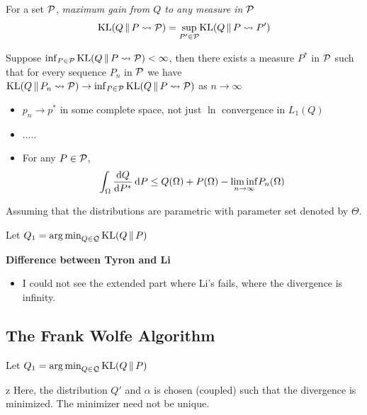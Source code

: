 For a set $\mathcal{P}$, \emph{maximum gain from $Q$ to any measure in $\mathcal{P}$}
\begin{equation*}
	\KL{Q}{P \rightsquigarrow \Pc}=\underset{P'\in\Pc}{\sup} \KL{Q}{P \rightsquigarrow P'}
\end{equation*}

\begin{thm}[Tyron]
	Suppose $\inf_{P\in\mathcal{P}} {\mathrm{KL}}({Q} \,\Vert\, {P \rightsquigarrow \mathcal{P}}) < \infty$, 
	then there exists a measure $P^*$ in $\mathcal{P}$
	such that for every sequence $P_n$ in $\mathcal{P}$ 
	we have \\
	${\mathrm{KL}}({Q} \,\Vert\, {P_n \rightsquigarrow \mathcal{P}}) \to \inf_{P\in\mathcal{P}}{\mathrm{KL}}({Q} \,\Vert\, {P \rightsquigarrow \mathcal{P}})$ as $n\to\infty$
	\begin{itemize}
		\item $p_n \to p^*$ in some complete space, not just $\ln$ convergence in $L_1(Q)$
		\item .....
		\item For any $P\in\mathcal{P}$,
		\begin{equation*}
			\int_{\Omega} \dv{Q}{P^*} \dd{P} \leq Q(\Omega) + P(\Omega) 
			- \underset{n\to\infty}{\lim\inf} P_{n}(\Omega)
		\end{equation*}
	\end{itemize}
\end{thm}

Assuming that the distributions are parametric with parameter set denoted by $\Theta$.
\begin{algorithm}
	\DontPrintSemicolon
	\caption{Li's Algorithm -- Greedy Approximation}
	\BlankLine
	Let $Q_1 = {\operatorname*{arg\, min}}_{Q \in \mathcal{Q}}\, {\mathrm{KL}}({Q} \,\Vert\, {P})$\;
\end{algorithm}

\textbf{Difference between Tyron and Li}

\begin{itemize}
	\item I could not see the extended part where Li's fails,
	where the divergence is infinity.
\end{itemize}

\subsection{The Frank Wolfe Algorithm}

\begin{algorithm}
	\DontPrintSemicolon
	\caption{The Frank Wolfe Algorithm}
	\BlankLine
	Let $Q_1 = {\operatorname*{arg\, min}}_{Q \in \mathcal{Q}}\, {\mathrm{KL}}({Q} \,\Vert\, {P})$\;
\end{algorithm}
z
Here, the distribution $Q'$ and $\alpha$ is chosen (coupled) such that the divergence is minimized.
The minimizer need not be unique.

